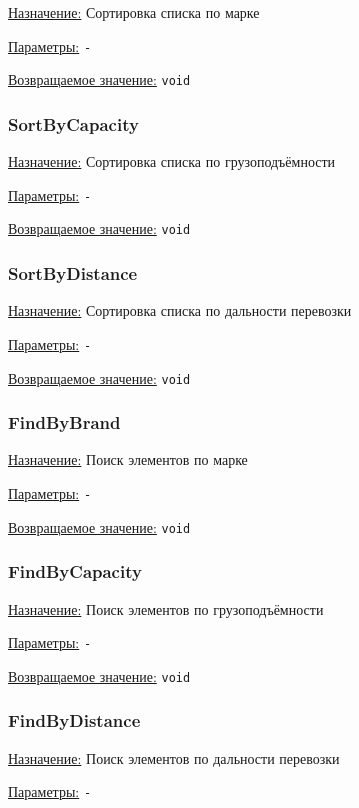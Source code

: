 \underline{Назначение:} Сортировка списка по марке

\underline{Параметры:} \verb|-|

\underline{Возвращаемое значение:} \verb|void|


\subsubsection*{SortByCapacity}

\underline{Назначение:} Сортировка списка по грузоподъёмности

\underline{Параметры:} \verb|-|

\underline{Возвращаемое значение:} \verb|void|


\subsubsection*{SortByDistance}

\underline{Назначение:} Сортировка списка по дальности перевозки

\underline{Параметры:} \verb|-|

\underline{Возвращаемое значение:} \verb|void|


\subsubsection*{FindByBrand}

\underline{Назначение:} Поиск элементов по марке

\underline{Параметры:} \verb|-|

\underline{Возвращаемое значение:} \verb|void|


\subsubsection*{FindByCapacity}

\underline{Назначение:} Поиск элементов по грузоподъёмности

\underline{Параметры:} \verb|-|

\underline{Возвращаемое значение:} \verb|void|


\subsubsection*{FindByDistance}

\underline{Назначение:} Поиск элементов по дальности перевозки

\underline{Параметры:} \verb|-|

